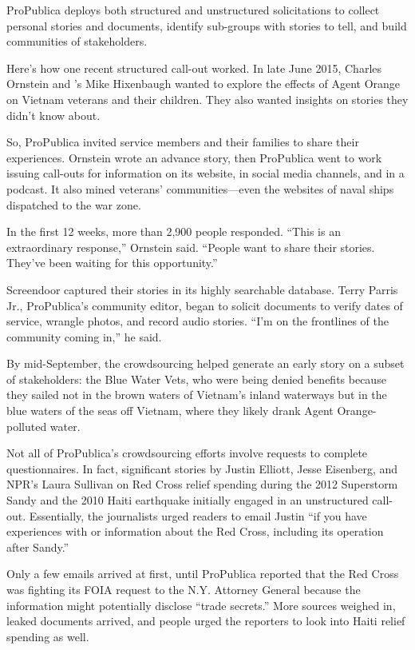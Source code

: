\begin{itemize}
\begin{enumerate}
{ProPublica deploys both structured and unstructured solicitations to collect personal stories and documents, identify sub-groups with stories to tell, and build communities of stakeholders.  

Here’s how one recent structured call-out worked. In late June 2015, Charles Ornstein and ’s Mike Hixenbaugh wanted to explore the effects of Agent Orange on Vietnam veterans and their children. They also wanted insights on stories they didn’t know about.

So, ProPublica invited service members and their families to share their experiences. Ornstein wrote an advance story, then ProPublica went to work issuing call-outs for information on its website, in social media channels, and in a podcast. It also mined veterans’ communities---even the websites of naval ships dispatched to the war zone. 

In the first 12 weeks, more than 2,900 people responded. ``This is an extraordinary response,'' Ornstein said. ``People want to share their stories. They’ve been waiting for this opportunity.''

Screendoor captured their stories in its highly searchable database. Terry Parris Jr., ProPublica’s community editor, began to solicit documents to verify dates of service, wrangle photos, and record audio stories. ``I’m on the frontlines of the community coming in,'' he said.\autocite{Parris}

By mid-September, the crowdsourcing helped generate an early story on a subset of stakeholders: the Blue Water Vets, who were being denied benefits because they sailed not in the brown waters of Vietnam’s inland waterways but in the blue waters of the seas off Vietnam, where they likely drank Agent Orange-polluted water.

Not all of ProPublica’s crowdsourcing efforts involve requests to complete questionnaires. In fact, significant stories by Justin Elliott, Jesse Eisenberg, and NPR’s Laura Sullivan on Red Cross relief spending during the 2012 Superstorm Sandy and the 2010 Haiti earthquake initially engaged in an unstructured call-out. Essentially, the journalists urged readers to email Justin ``if you have experiences with or information about the Red Cross, including its operation after Sandy.''

Only a few emails arrived at first, until ProPublica reported that the Red Cross was fighting its FOIA request to the N.Y. Attorney General because the information might potentially disclose ``trade secrets.'' More sources weighed in, leaked documents arrived, and people urged the reporters to look into Haiti relief spending as well.  

}
\end{enumerate}
\end{itemize}
